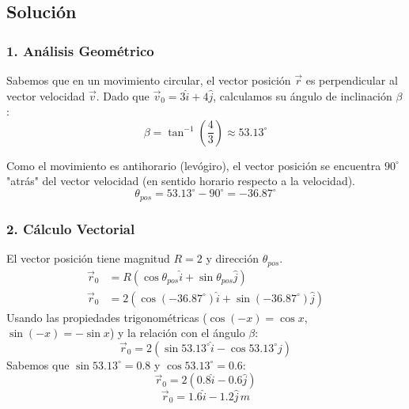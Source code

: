 \documentclass[12pt, a4paper]{article}
\begin{document}
\begin{center}
\end{center}

\subsection*{Solución}

\subsubsection*{1. Análisis Geométrico}
Sabemos que en un movimiento circular, el vector posición $\vec{r}$ es perpendicular al vector velocidad $\vec{v}$.
Dado que $\vec{v}_0 = 3\hat{i} + 4\hat{j}$, calculamos su ángulo de inclinación $\beta$:
$$ \beta = \tan^{-1}\left(\frac{4}{3}\right) \approx 53.13^\circ $$

Como el movimiento es antihorario (levógiro), el vector posición se encuentra $90^\circ$ "atrás" del vector velocidad (en sentido horario respecto a la velocidad).
$$ \theta_{pos} = 53.13^\circ - 90^\circ = -36.87^\circ $$

\subsubsection*{2. Cálculo Vectorial}
El vector posición tiene magnitud $R=2$ y dirección $\theta_{pos}$.
\begin{align*}
    \vec{r}_0 &= R (\cos \theta_{pos} \hat{i} + \sin \theta_{pos} \hat{j}) \\
    \vec{r}_0 &= 2 (\cos(-36.87^\circ)\hat{i} + \sin(-36.87^\circ)\hat{j})
\end{align*}
Usando las propiedades trigonométricas ($\cos(-x)=\cos x$, $\sin(-x)=-\sin x$) y la relación con el ángulo $\beta$:
$$ \vec{r}_0 = 2 (\sin 53.13^\circ \hat{i} - \cos 53.13^\circ \hat{j}) $$
Sabemos que $\sin 53.13^\circ = 0.8$ y $\cos 53.13^\circ = 0.6$:
$$ \vec{r}_0 = 2 (0.8 \hat{i} - 0.6 \hat{j}) $$
$$ \vec{r}_0 = 1.6\hat{i} - 1.2\hat{j} \, \si{m} $$
\end{document}
